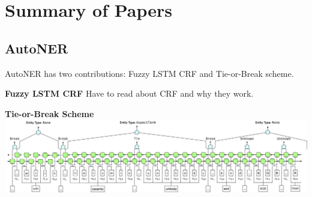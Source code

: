 \section{Summary of Papers}
\label{sec:summary}

\subsection{AutoNER}
AutoNER \cite{autoner} has two contributions: Fuzzy LSTM CRF and Tie-or-Break scheme.


\noindent\textbf{Fuzzy LSTM CRF}
Have to read about CRF and why they work.

\noindent\textbf{Tie-or-Break Scheme}
\includegraphics[scale=0.5]{images/autoner_tie_or_break.png}
